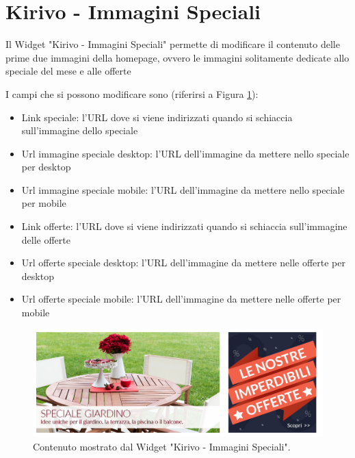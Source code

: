 




\newpage


\section{Kirivo - Immagini Speciali}

Il Widget "Kirivo - Immagini Speciali" permette di modificare il contenuto
delle prime due immagini della homepage, ovvero le immagini solitamente dedicate
allo speciale del mese e alle offerte 

I campi che si possono modificare sono (riferirsi a Figura \ref{fig:kspec}):
\begin{itemize}
\item Link speciale: l'URL dove si viene indirizzati quando si schiaccia sull'immagine dello speciale
\item Url immagine speciale desktop: l'URL dell'immagine da mettere nello speciale per desktop
\item Url immagine speciale mobile: l'URL dell'immagine da mettere nello speciale per mobile
\item Link offerte: l'URL dove si viene indirizzati quando si schiaccia sull'immagine delle offerte
\item Url offerte speciale desktop: l'URL dell'immagine da mettere nelle offerte per desktop
\item Url offerte speciale mobile: l'URL dell'immagine da mettere nelle offerte per mobile
\end{itemize}

\begin{figure}
  \includegraphics[width=\textwidth]{figure/kspec.png}
  \caption{Contenuto mostrato dal Widget "Kirivo - Immagini Speciali".}
  \label{fig:kspec}
\end{figure}

